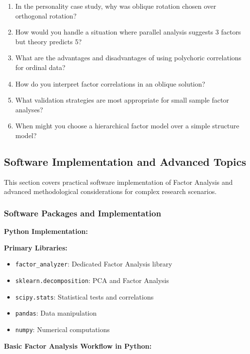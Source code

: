 \documentclass[
]{article}
\begin{document}
\begin{enumerate}
\item
  In the personality case study, why was oblique rotation chosen over
  orthogonal rotation?
\item
  How would you handle a situation where parallel analysis suggests 3
  factors but theory predicts 5?
\item
  What are the advantages and disadvantages of using polychoric
  correlations for ordinal data?
\item
  How do you interpret factor correlations in an oblique solution?
\item
  What validation strategies are most appropriate for small sample
  factor analyses?
\item
  When might you choose a hierarchical factor model over a simple
  structure model?
\end{enumerate}

\subsection{Software Implementation and Advanced Topics}

This section covers practical software implementation of Factor Analysis
and advanced methodological considerations for complex research
scenarios.

\subsubsection{Software Packages and Implementation}

\textbf{Python Implementation:}

\textbf{Primary Libraries:}

\begin{itemize}
\item
  \texttt{factor\_analyzer}: Dedicated Factor Analysis library
\item
  \texttt{sklearn.decomposition}: PCA and Factor Analysis
\item
  \texttt{scipy.stats}: Statistical tests and correlations
\item
  \texttt{pandas}: Data manipulation
\item
  \texttt{numpy}: Numerical computations
\end{itemize}

\textbf{Basic Factor Analysis Workflow in Python:}
\end{document}
